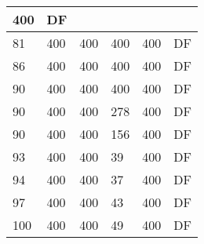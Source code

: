 \begin{table}[]
\begin{tabular}{lllll|l|}
400                                & DF                                    \\ \hline
81                                  & 400                                & 400                                & 400                                & 
400                                & DF                                    \\ \hline
86                                  & 400                                & 400                                & 400                                & 
400                                & DF                                    \\ \hline
90                                  & 400                                & 400                                & 400                                & 
400                                & DF                                    \\ \hline
90                                  & 400                                & 400                                & 278                                & 
400                                & DF                                    \\ \hline
90                                  & 400                                & 400                                & 156                                & 
400                                & DF                                    \\ \hline
93                                  & 400                                & 400                                & 39                                 & 
400                                & DF                                    \\ \hline
94                                  & 400                                & 400                                & 37                                 & 
400                                & DF                                    \\ \hline
97                                  & 400                                & 400                                & 43                                 & 
400                                & DF                                    \\ \hline
100                                 & 400                                & 400                                & 49                                 & 
400                                & DF                                    \\ \hline

\end{tabular}
\end{table}
